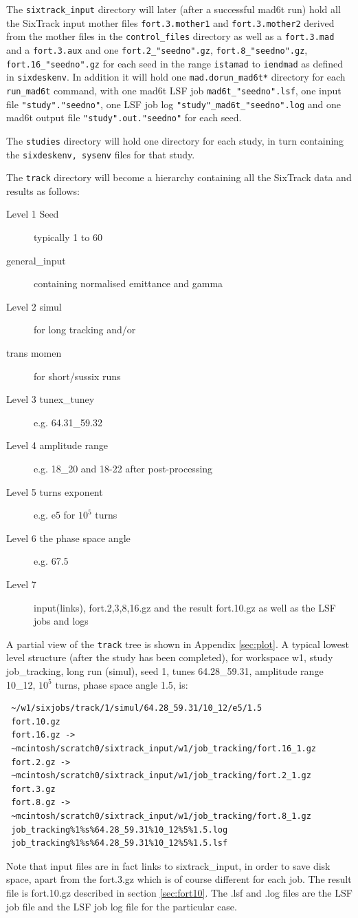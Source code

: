 \documentclass{cernatsnote}    %
\begin{document}
The {\tt sixtrack\_input} directory will later (after a successful mad6t run)
hold all the SixTrack input 
mother files {\tt fort.3.mother1} and {\tt fort.3.mother2} derived from the mother files
in the {\tt control\_files} directory as well as a {\tt fort.3.mad} and a {\tt fort.3.aux}
and one {\tt fort.2\_"seedno".gz}, {\tt fort.8\_"seedno".gz}, 
{\tt fort.16\_"seedno".gz}
for each seed in the range {\tt istamad} to {\tt iendmad} as defined in
{\tt sixdeskenv}. In addition it will
hold one {\tt mad.dorun\_mad6t*} directory for each {\tt run\_mad6t} command,
with one mad6t LSF job {\tt mad6t\_"seedno".lsf}, one input file {\tt "study"."seedno"}, 
one LSF job log 
{\tt "study"\_mad6t\_"seedno".log} 
and one mad6t output file 
{\tt "study".out."seedno"} for each seed. 

The {\tt studies} directory will hold one directory for each study, in turn
containing the {\tt sixdeskenv, sysenv} files for that study.

The {\tt track} directory will become a hierarchy containing all the SixTrack data
and results as follows:
\begin{description}
\item [Level 1 Seed] typically 1 to 60
\item[         general\_input] containing normalised emittance and gamma
\item [Level 2 simul] for long tracking and/or 
\item [        trans momen] for short/sussix runs
\item [Level 3 tunex\_tuney] e.g. 64.31\_59.32
\item [Level 4 amplitude range] e.g. 18\_20 and 18-22 after post-processing
\item [Level 5 turns exponent] e.g. e5 for $10^5$ turns
\item [Level 6 the phase space angle] e.g. 67.5  
\item [Level 7] input(links), fort.2,3,8,16.gz and the result fort.10.gz 
as well as the LSF jobs and logs
\end{description}
A partial view of the {\tt track} tree is shown in Appendix \ref{sec:plot}.
A typical lowest level structure (after the study has been completed),
for workspace w1, study job\_tracking, long run (simul), seed 1,
tunes 64.28\_59.31, amplitude range 10\_12, $10^5$ turns, phase space angle 1.5, is:
\begin{verbatim}
 ~/w1/sixjobs/track/1/simul/64.28_59.31/10_12/e5/1.5
 fort.10.gz
 fort.16.gz -> 
 ~mcintosh/scratch0/sixtrack_input/w1/job_tracking/fort.16_1.gz
 fort.2.gz -> 
 ~mcintosh/scratch0/sixtrack_input/w1/job_tracking/fort.2_1.gz
 fort.3.gz
 fort.8.gz -> 
 ~mcintosh/scratch0/sixtrack_input/w1/job_tracking/fort.8_1.gz
 job_tracking%1%s%64.28_59.31%10_12%5%1.5.log
 job_tracking%1%s%64.28_59.31%10_12%5%1.5.lsf
\end{verbatim}
Note that input files are in fact links to sixtrack\_input, in order to save disk space,
apart from the fort.3.gz which is of course different for each job. The result
file is fort.10.gz described in section \ref{sec:fort10}. The .lsf and .log
files are the LSF job file and the LSF job log file for the particular case. 
\end{document}
